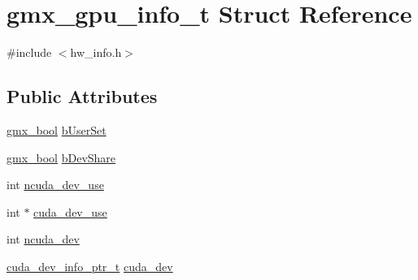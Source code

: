 \hypertarget{structgmx__gpu__info__t}{\section{gmx\-\_\-gpu\-\_\-info\-\_\-t \-Struct \-Reference}
\label{structgmx__gpu__info__t}
}


{\ttfamily \#include $<$hw\-\_\-info.\-h$>$}

\subsection*{\-Public \-Attributes}
\begin{DoxyCompactItemize}
\item 
\hyperlink{include_2types_2simple_8h_a8fddad319f226e856400d190198d5151}{gmx\-\_\-bool} \hyperlink{structgmx__gpu__info__t_ab0fe6ecc1f65175b59376ad4d92f7838}{b\-User\-Set}
\item 
\hyperlink{include_2types_2simple_8h_a8fddad319f226e856400d190198d5151}{gmx\-\_\-bool} \hyperlink{structgmx__gpu__info__t_ad1be37a066ae7dd356f94d609ae85837}{b\-Dev\-Share}
\item 
int \hyperlink{structgmx__gpu__info__t_aece31d9c0b161fa463fb62dc814dd416}{ncuda\-\_\-dev\-\_\-use}
\item 
int $\ast$ \hyperlink{structgmx__gpu__info__t_acbf24cd2a75902aff2374d855c45c1f3}{cuda\-\_\-dev\-\_\-use}
\item 
int \hyperlink{structgmx__gpu__info__t_af205c89754844a12a42aa689765276cf}{ncuda\-\_\-dev}
\item 
\hyperlink{include_2types_2nbnxn__cuda__types__ext_8h_a167bbdcf54368ebedd257679674cdda5}{cuda\-\_\-dev\-\_\-info\-\_\-ptr\-\_\-t} \hyperlink{structgmx__gpu__info__t_a744fa9d64583a6ed0a804ec224dcb21a}{cuda\-\_\-dev}
\end{DoxyCompactItemize}


